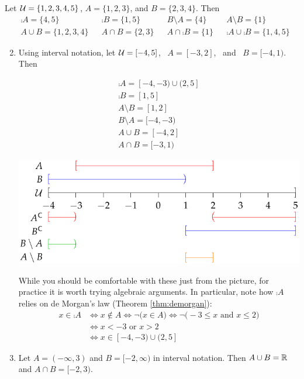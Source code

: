 \begin{examples}{}{}
	\exstart Let $\mathcal{U}=\{1,2,3,4,5\}$, $A=\{1,2,3\}$, and $B=\{2,3,4\}$. Then
	\begin{align*}
		&\comp A=\{4,5\} &&\comp B=\{1,5\} &&B\setminus A=\{4\} &&A\setminus B=\{1\}\\
		&A\cup B=\{1,2,3,4\} &&A\cap B=\{2,3\} &&A\cap\comp B=\{1\} &&\comp A\cup\comp B=\{1,4,5\}
	\end{align*}
	
	\goodbreak
		
	\begin{enumerate}\setcounter{enumi}{1}
		\item Using interval notation, let $\mathcal{U}=[-4,5]$, \ $A=[-3,2]$, \ and \ $B=[-4,1)$. Then\par
		\begin{minipage}[t]{0.3\linewidth}\vspace{-13pt}
			\begin{gather*}
			\comp A=[-4,-3)\cup (2,5]\\
			\comp B=[1,5]\\
			A\setminus B=[1,2]\\
			B\setminus A=[-4,-3)\\
			A\cup B=[-4,2]\\
			A\cap B=[-3,1) 
			\end{gather*}
		\end{minipage}
		\hfill
		\begin{minipage}[t]{0.69\linewidth}\vspace{0pt}
			\flushright\includegraphics[scale=0.8]{sets-13-intervalex}
		\end{minipage}
		\smallbreak
		While you should be comfortable with these just from the picture, for practice it is worth trying algebraic arguments. In particular, note how $\comp A$ relies on de Morgan's law (Theorem \ref{thm:demorgan}):
		\begin{align*}
			x\in \comp A&\iff x\notin A\iff \neg\bigl(x\in A\bigr) \iff\neg\bigl(-3\le x \text{ and }x\le 2\bigr)\\
			&\iff x<-3\text{ or }x>2 \tag{de Morgan}\\
			&\iff x\in[-4,-3)\cup (2,5] \tag{remember that $x\in\cU$ always!}
		\end{align*}
		
		\item Let $A=(-\infty,3)$ and $B=[-2,\infty)$ in interval notation. Then $A\cup B=\mathbb{R}$ and $A\cap B=[-2,3)$.
	\end{enumerate}
\end{examples}


